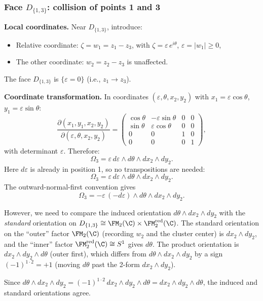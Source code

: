 \subsubsection{\texorpdfstring{Face $D_{\{1,3\}}$: collision of points 1 and 3}{Face D13: collision of points 1 and 3}}

\textbf{Local coordinates.} Near $D_{\{1,3\}}$, introduce:
\begin{itemize}
\item Relative coordinate: $\zeta = w_1 = z_1 - z_3$, with $\zeta = \varepsilon\,e^{i\theta}$, $\varepsilon = |w_1| \ge 0$,
\item The other coordinate: $w_2 = z_2 - z_3$ is unaffected.
\end{itemize}
The face $D_{\{1,3\}}$ is $\{\varepsilon = 0\}$ (i.e., $z_1 \to z_3$).

\textbf{Coordinate transformation.} In coordinates $(\varepsilon,\theta,x_2,y_2)$ with $x_1 = \varepsilon\cos\theta$, $y_1 = \varepsilon\sin\theta$:
\[
\frac{\partial(x_1,y_1,x_2,y_2)}{\partial(\varepsilon,\theta,x_2,y_2)} = \begin{pmatrix}\cos\theta & -\varepsilon\sin\theta & 0&0\\ \sin\theta & \varepsilon\cos\theta & 0&0\\ 0&0&1&0\\ 0&0&0&1\end{pmatrix},
\]
with determinant $\varepsilon$. Therefore:
\[
\Omega_3 = \varepsilon\,d\varepsilon\wedge d\theta\wedge dx_2\wedge dy_2.
\]
Here $d\varepsilon$ is already in position 1, so no transpositions are needed:
\[
\Omega_3 = \varepsilon\,d\varepsilon\wedge d\theta\wedge dx_2\wedge dy_2.
\]
The outward-normal-first convention gives
\[
\Omega_3 = -\varepsilon\,(-d\varepsilon)\wedge d\theta\wedge dx_2\wedge dy_2.
\]

However, we need to compare the induced orientation $d\theta\wedge dx_2\wedge dy_2$ with the \emph{standard} orientation on $D_{\{1,3\}} \cong \FM_2(\C)\times \FM_2^{\mathrm{red}}(\C)$. The standard orientation on the ``outer'' factor $\FM_2(\C)$ (recording $w_2$ and the cluster center) is $dx_2\wedge dy_2$, and the ``inner'' factor $\FM_2^{\mathrm{red}}(\C) \cong S^1$ gives $d\theta$. The product orientation is $dx_2\wedge dy_2\wedge d\theta$ (outer first), which differs from $d\theta\wedge dx_2\wedge dy_2$ by a sign $(-1)^{1\cdot 2} = +1$ (moving $d\theta$ past the 2-form $dx_2\wedge dy_2$).

Since $d\theta\wedge dx_2\wedge dy_2 = (-1)^{1\cdot 2}\,dx_2\wedge dy_2\wedge d\theta = dx_2\wedge dy_2\wedge d\theta$, the induced and standard orientations agree.

